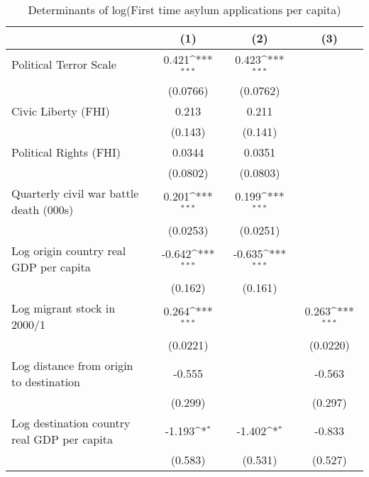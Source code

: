 \begin{table}[htbp]\centering
\def\sym#1{\ifmmode^{#1}\else\(^{#1}\)\fi}
\caption{Determinants of log(First time asylum applications per capita)}
\begin{tabular}{l*{3}{c}}
\hline\hline
                    &\multicolumn{1}{c}{(1)}         &\multicolumn{1}{c}{(2)}         &\multicolumn{1}{c}{(3)}         \\
\hline
Political Terror Scale&       0.421\sym{***}&       0.423\sym{***}&                     \\
                    &    (0.0766)         &    (0.0762)         &                     \\
[1em]
Civic Liberty (FHI) &       0.213         &       0.211         &                     \\
                    &     (0.143)         &     (0.141)         &                     \\
[1em]
Political Rights (FHI)&      0.0344         &      0.0351         &                     \\
                    &    (0.0802)         &    (0.0803)         &                     \\
[1em]
Quarterly civil war battle death (000s)&       0.201\sym{***}&       0.199\sym{***}&                     \\
                    &    (0.0253)         &    (0.0251)         &                     \\
[1em]
Log origin country real GDP per capita&      -0.642\sym{***}&      -0.635\sym{***}&                     \\
                    &     (0.162)         &     (0.161)         &                     \\
[1em]
Log migrant stock in 2000/1&       0.264\sym{***}&                     &       0.263\sym{***}\\
                    &    (0.0221)         &                     &    (0.0220)         \\
[1em]
Log distance from origin to destination&      -0.555         &                     &      -0.563         \\
                    &     (0.299)         &                     &     (0.297)         \\
[1em]
Log destination country real GDP per capita&      -1.193\sym{*}  &      -1.402\sym{*}  &      -0.833         \\
                    &     (0.583)         &     (0.531)         &     (0.527)         \\

\end{tabular}
\end{table}
